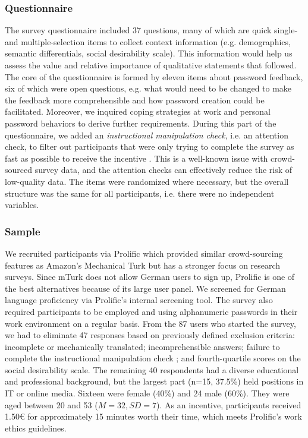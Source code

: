 \subsubsection{Questionnaire}
The survey questionnaire included 37 questions, many of which are quick single- and multiple-selection items to collect context information (e.g. demographics, semantic differentials, social desirability scale). This information would help us assess the value and relative importance of qualitative statements that followed. The core of the questionnaire is formed by eleven items about password feedback, six of which were open questions, e.g. what would need to be changed to make the feedback more comprehensible and how password creation could be facilitated. Moreover, we inquired coping strategies at work and personal password behaviors to derive further requirements. During this part of the questionnaire, we added an \textit{instructional manipulation check}, i.e. an attention check, to filter out participants that were only trying to complete the survey as fast as possible to receive the incentive \cite{Oppenheimer2009InstructionalManipulationChecks}. This is a well-known issue with crowd-sourced survey data, and the attention checks can effectively reduce the risk of low-quality data. The items were randomized where necessary, but the overall structure was the same for all participants, i.e. there were no independent variables. 

\subsubsection{Sample}
We recruited participants via Prolific which provided similar crowd-sourcing features as Amazon's Mechanical Turk but has a stronger focus on research surveys. Since \gls{mTurk} does not allow German users to sign up, Prolific is one of the best alternatives because of its large user panel. We screened for German language proficiency via Prolific's internal screening tool. The survey also required participants to be employed and using alphanumeric passwords in their work environment on a regular basis. 
From the 87 users who started the survey, we had to eliminate 47 responses based on previously defined exclusion criteria: incomplete or mechanically translated; incomprehensible answers; failure to complete the instructional manipulation check \cite{Oppenheimer2009InstructionalManipulationChecks}; and fourth-quartile scores on the social desirability scale. The remaining 40 respondents had a diverse educational and professional background, but the largest part (n=15, 37.5\%) held positions in IT or online media. Sixteen were female (40\%) and 24 male (60\%). They were aged between 20 and 53 ($M=32, SD=7$). As an incentive, participants received 1.50€ for approximately 15 minutes worth their time, which meets Prolific's work ethics guidelines. 

